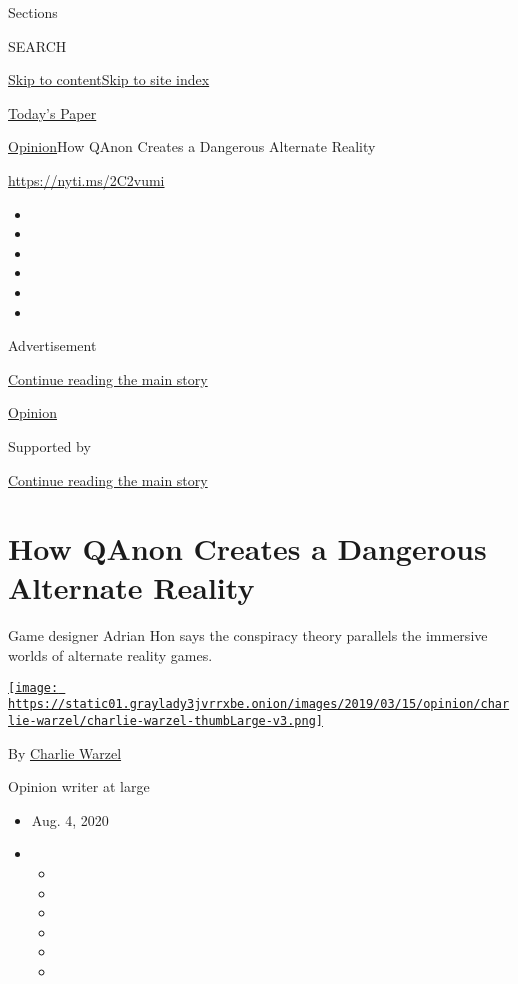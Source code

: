 Sections

SEARCH

\protect\hyperlink{site-content}{Skip to
content}\protect\hyperlink{site-index}{Skip to site index}

\href{https://myaccount.nytimes3xbfgragh.onion/auth/login?response_type=cookie\&client_id=vi}{}

\href{https://www.nytimes3xbfgragh.onion/section/todayspaper}{Today's
Paper}

\href{/section/opinion}{Opinion}\textbar{}How QAnon Creates a Dangerous
Alternate Reality

\url{https://nyti.ms/2C2vumi}

\begin{itemize}
\item
\item
\item
\item
\item
\item
\end{itemize}

Advertisement

\protect\hyperlink{after-top}{Continue reading the main story}

\href{/section/opinion}{Opinion}

Supported by

\protect\hyperlink{after-sponsor}{Continue reading the main story}

\hypertarget{how-qanon-creates-a-dangerous-alternate-reality}{%
\section{How QAnon Creates a Dangerous Alternate
Reality}\label{how-qanon-creates-a-dangerous-alternate-reality}}

Game designer Adrian Hon says the conspiracy theory parallels the
immersive worlds of alternate reality games.

\href{https://www.nytimes3xbfgragh.onion/by/charlie-warzel}{\texttt{[image: https://static01.graylady3jvrrxbe.onion/images/2019/03/15/opinion/charlie-warzel/charlie-warzel-thumbLarge-v3.png]}}

By \href{https://www.nytimes3xbfgragh.onion/by/charlie-warzel}{Charlie
Warzel}

Opinion writer at large

\begin{itemize}
\item
  Aug. 4, 2020
\item
  \begin{itemize}
  \item
  \item
  \item
  \item
  \item
  \item
  \end{itemize}
\end{itemize}

